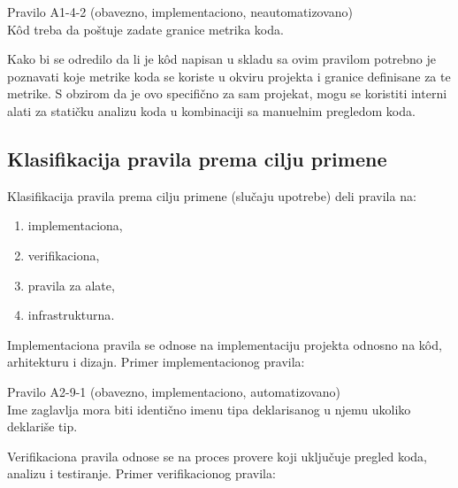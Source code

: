 \documentclass[12pt,oneside]{memoir}
\begin{document}
\begin{center}
\begin{tcolorbox}
Pravilo A1-4-2 (obavezno, implementaciono, neautomatizovano) \\
K\^{o}d treba da poštuje zadate granice metrika koda.
\end{tcolorbox}
\end{center}


  Kako bi se odredilo da li je k\^{o}d napisan u skladu sa ovim pravilom potrebno je poznavati koje metrike koda se koriste u okviru projekta i
  granice definisane za te metrike. S obzirom da je ovo specifično za sam projekat, mogu se koristiti interni alati za statičku analizu koda u kombinaciji
  sa manuelnim pregledom koda. 

\subsection{Klasifikacija pravila prema cilju primene}
Klasifikacija pravila prema cilju primene (slučaju upotrebe) deli pravila na:

\begin{enumerate}
  \item{implementaciona},
  \item{verifikaciona},
  \item{pravila za alate},
  \item{infrastrukturna}.
\end{enumerate}

Implementaciona pravila se odnose na implementaciju projekta odnosno na k\^{o}d, arhitekturu i dizajn.
Primer implementacionog pravila:

\begin{center}
\begin{tcolorbox}
Pravilo A2-9-1 (obavezno, implementaciono, automatizovano) \\
Ime zaglavlja mora biti identično imenu tipa deklarisanog u njemu ukoliko deklariše tip.
\end{tcolorbox}
\end{center}


Verifikaciona pravila odnose se na proces provere koji uključuje pregled koda, analizu i testiranje.
Primer verifikacionog pravila:
\end{document}
